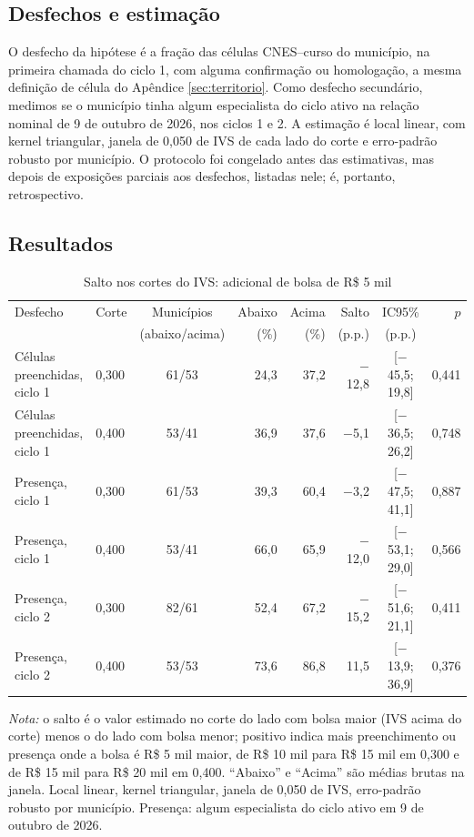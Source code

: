 \documentclass[11pt,a4paper]{article}
\begin{document}
\subsection{Desfechos e estimação}

O desfecho da hipótese é a fração das células CNES--curso do município, na
primeira chamada do ciclo 1, com alguma confirmação ou homologação, a mesma
definição de célula do Apêndice \ref{sec:territorio}. Como desfecho secundário,
medimos se o município tinha algum especialista do ciclo ativo na relação
nominal de 9 de outubro de 2026, nos ciclos 1 e 2. A estimação é local linear,
com kernel triangular, janela de 0,050 de IVS de cada lado do corte e
erro-padrão robusto por município. O protocolo foi congelado antes das
estimativas, mas depois de exposições parciais aos desfechos, listadas nele; é,
portanto, retrospectivo.

\subsection{Resultados}

\begin{table}[htbp]
\centering
\footnotesize
\setlength{\tabcolsep}{4pt}
\caption{Salto nos cortes do IVS: adicional de bolsa de R\$ 5 mil}
\label{tab:bolsa}
\begin{tabular}{llcrrrcr}
\toprule
Desfecho & Corte & Municípios & Abaixo & Acima & Salto & IC95\% & $p$ \\
 & & (abaixo/acima) & (\%) & (\%) & (p.p.) & (p.p.) & \\
\midrule
Células preenchidas, ciclo 1 & 0,300 & 61/53 & 24,3 & 37,2 & $-$12,8 & [$-$45,5; 19,8] & 0,441 \\
Células preenchidas, ciclo 1 & 0,400 & 53/41 & 36,9 & 37,6 & $-$5,1 & [$-$36,5; 26,2] & 0,748 \\
Presença, ciclo 1 & 0,300 & 61/53 & 39,3 & 60,4 & $-$3,2 & [$-$47,5; 41,1] & 0,887 \\
Presença, ciclo 1 & 0,400 & 53/41 & 66,0 & 65,9 & $-$12,0 & [$-$53,1; 29,0] & 0,566 \\
Presença, ciclo 2 & 0,300 & 82/61 & 52,4 & 67,2 & $-$15,2 & [$-$51,6; 21,1] & 0,411 \\
Presença, ciclo 2 & 0,400 & 53/53 & 73,6 & 86,8 & 11,5 & [$-$13,9; 36,9] & 0,376 \\
\bottomrule
\end{tabular}

\vspace{2pt}
\begin{minipage}{0.94\textwidth}
\footnotesize \textit{Nota:} o salto é o valor estimado no corte do lado com
bolsa maior (IVS acima do corte) menos o do lado com bolsa menor; positivo
indica mais preenchimento ou presença onde a bolsa é R\$ 5 mil maior, de
R\$ 10 mil para R\$ 15 mil em 0,300 e de R\$ 15 mil para R\$ 20 mil em 0,400.
``Abaixo'' e ``Acima'' são médias brutas na janela. Local linear, kernel
triangular, janela de 0,050 de IVS, erro-padrão robusto por município.
Presença: algum especialista do ciclo ativo em 9 de outubro de 2026.
\end{minipage}
\end{table}
\end{document}

